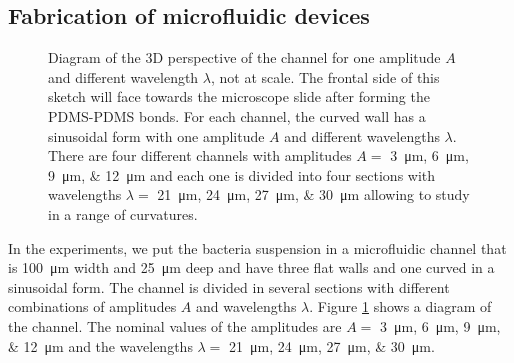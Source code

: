 \subsection{Fabrication of microfluidic devices}

\begin{figure}[H]
	\centering
	
	\caption[Channel diagram]{Diagram of the 3D perspective of the channel for one amplitude $A$ and different wavelength $\lambda$, not at scale. The frontal side of this sketch will face towards the microscope slide after forming the PDMS-PDMS bonds. For each channel, the curved wall has a sinusoidal form with one amplitude $A$ and different wavelengths $\lambda$. There are four different channels with amplitudes $A=$ \SIlist[list-units=single, list-final-separator = {, }]{3;6;9;12}{\micro\meter} and each one is divided into four sections with wavelengths $\lambda=$ \SIlist[list-units=single, list-final-separator = {, }]{21;24;27;30}{\micro\meter} allowing to study in a range of curvatures.}
	\label{channel_diagram}
\end{figure}

In the experiments, we put the bacteria suspension in a microfluidic channel that is \SI{100}{\micro\meter} width and \SI{25}{\micro\meter} deep and have three flat walls and one curved in a sinusoidal form. The channel is divided in several sections with different combinations of amplitudes $A$ and wavelengths $\lambda$. Figure \ref{channel_diagram} shows a diagram of the channel.  The nominal values of the amplitudes are  $A=$ \SIlist[list-units=single, list-final-separator = {, }]{3;6;9;12}{\micro\meter} and the wavelengths $\lambda=$ \SIlist[list-units=single, list-final-separator = {, }]{21;24;27;30}{\micro\meter}. 


